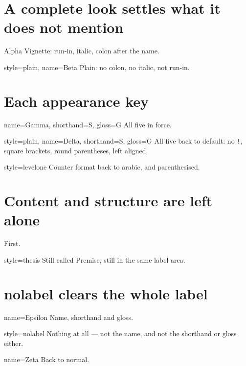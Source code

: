 \documentclass{article}
\begin{document}
\section{A complete look settles what it does not mention}

{
\begin{prop}
  \item[Alpha] Vignette: run-in, italic, colon after the name.
  \item[style=plain, name=Beta] Plain: no colon, no italic, not run-in.
\end{prop}}

\section{Each appearance key}

{
\begin{prop}
  \item[name=Gamma, shorthand=S, gloss=G] All five in force.
  \item[style=plain, name=Delta, shorthand=S, gloss=G] All five back to
    default: no \texttt{!}, square brackets, round parentheses, left aligned.
  \item[style=levelone] Counter format back to arabic, and parenthesised.
\end{prop}}

\section{Content and structure are left alone}

\begin{prop}[name=Premise, counter=enumprop, labelwidth=6em]
  \item First.
  \item[style=thesis] Still called Premise, still in the same label area.
\end{prop}

\section{nolabel clears the whole label}

\begin{prop}[shorthand=S, gloss=G]
  \item[name=Epsilon] Name, shorthand and gloss.
  \item[style=nolabel] Nothing at all --- not the name, and not the shorthand
    or gloss either.
  \item[name=Zeta] Back to normal.
\end{prop}
\end{document}
